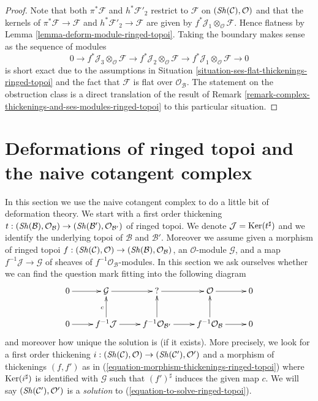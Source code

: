 \begin{proof}
Note that both $\pi^*\mathcal{F}$ and $h^*\mathcal{F}'_2$
restrict to $\mathcal{F}$ on $(\mathop{\mathit{Sh}}\nolimits(\mathcal{C}), \mathcal{O})$
and that the kernels of
$\pi^*\mathcal{F} \to \mathcal{F}$ and $h^*\mathcal{F}'_2 \to \mathcal{F}$
are given by $f^*\mathcal{J}_1 \otimes_\mathcal{O} \mathcal{F}$.
Hence flatness by Lemma \ref{lemma-deform-module-ringed-topoi}.
Taking the boundary makes sense as the sequence of modules
$$
0 \to f^*\mathcal{J}_3 \otimes_\mathcal{O} \mathcal{F} \to
f^*\mathcal{J}_2 \otimes_\mathcal{O} \mathcal{F} \to
f^*\mathcal{J}_1 \otimes_\mathcal{O} \mathcal{F} \to 0
$$
is short exact due to the assumptions in
Situation \ref{situation-ses-flat-thickenings-ringed-topoi}
and the fact that $\mathcal{F}$ is flat over $\mathcal{O}_\mathcal{B}$.
The statement on the obstruction class is a direct translation
of the result of
Remark \ref{remark-complex-thickenings-and-ses-modules-ringed-topoi}
to this particular situation.
\end{proof}







\section{Deformations of ringed topoi and the naive cotangent complex}
\label{section-deformations-ringed-topoi}

\noindent
In this section we use the naive cotangent complex to do a little bit
of deformation theory. We start with a first order thickening
$t : (\mathop{\mathit{Sh}}\nolimits(\mathcal{B}), \mathcal{O}_\mathcal{B}) \to
(\mathop{\mathit{Sh}}\nolimits(\mathcal{B}'), \mathcal{O}_{\mathcal{B}'})$ of ringed topoi.
We denote $\mathcal{J} = \mathop{\mathrm{Ker}}(t^\sharp)$ and we
identify the underlying topoi of $\mathcal{B}$ and $\mathcal{B}'$.
Moreover we assume given a morphism of ringed topoi
$f : (\mathop{\mathit{Sh}}\nolimits(\mathcal{C}), \mathcal{O}) \to
(\mathop{\mathit{Sh}}\nolimits(\mathcal{B}), \mathcal{O}_\mathcal{B})$, an $\mathcal{O}$-module
$\mathcal{G}$, and a map $f^{-1}\mathcal{J} \to \mathcal{G}$
of sheaves of $f^{-1}\mathcal{O}_\mathcal{B}$-modules.
In this section we ask ourselves whether we can find
the question mark fitting into the following diagram
\begin{equation}
\label{equation-to-solve-ringed-topoi}
\vcenter{
\xymatrix{
0 \ar[r] & \mathcal{G} \ar[r] & {?} \ar[r] & \mathcal{O} \ar[r] & 0 \\
0 \ar[r] & f^{-1}\mathcal{J} \ar[u]^c \ar[r] &
f^{-1}\mathcal{O}_{\mathcal{B}'} \ar[u] \ar[r] &
f^{-1}\mathcal{O}_\mathcal{B} \ar[u] \ar[r] & 0
}
}
\end{equation}
and moreover how unique the solution is (if it exists). More precisely,
we look for a first order thickening
$i : (\mathop{\mathit{Sh}}\nolimits(\mathcal{C}), \mathcal{O}) \to (\mathop{\mathit{Sh}}\nolimits(\mathcal{C}'), \mathcal{O}')$
and a morphism of thickenings $(f, f')$ as in
(\ref{equation-morphism-thickenings-ringed-topoi})
where $\mathop{\mathrm{Ker}}(i^\sharp)$ is identified with $\mathcal{G}$
such that $(f')^\sharp$ induces the given map $c$.
We will say $(\mathop{\mathit{Sh}}\nolimits(\mathcal{C}'), \mathcal{O}')$ is a {\it solution} to
(\ref{equation-to-solve-ringed-topoi}).


